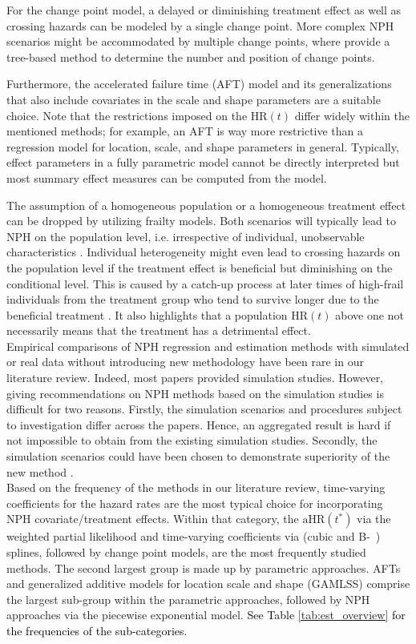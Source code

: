 \documentclass{article}
\newcommand{\NEW}[2][black]{\textcolor{#1}{#2}}
\begin{document}
\noindent For the change point model, a delayed or diminishing treatment effect as well as crossing hazards can be modeled by a single change point. 
More complex NPH scenarios might be accommodated by multiple change points, where \cite{Xu.2002} provide a tree-based method to determine the number and position of change points.

\noindent Furthermore, the accelerated failure time (AFT) model and its generalizations that also include covariates in the scale and shape parameters are a suitable choice. 
Note that the restrictions imposed on the $\text{HR}(t)$ differ widely within the mentioned methods; for example, an AFT is way more restrictive than a regression model for location, scale, and shape parameters in general. 
Typically, effect parameters in a fully parametric model cannot be directly interpreted but most summary effect measures can be computed from the model.

\noindent The assumption of a homogeneous population or a homogeneous treatment effect can be dropped by utilizing frailty models.
Both scenarios will typically lead to NPH on the population level, i.e. irrespective of individual, unobservable characteristics \cite{Hernan.2010,Martinussen.2020}.
Individual heterogeneity might even lead to crossing hazards on the population level if the treatment effect is beneficial but diminishing on the conditional level.
This is caused by a catch-up process at later times of high-frail individuals from the treatment group who tend to survive longer due to the beneficial treatment \cite[p.252]{Aalen.2008}.
It also highlights that a population $\text{HR}(t)$ above one not necessarily means that the treatment has a detrimental effect.
\\
\noindent Empirical comparisons of NPH regression and estimation methods with simulated or real data without introducing new methodology have been rare in our literature review.
Indeed, most papers provided simulation studies. 
However, giving recommendations on NPH methods based on the simulation studies is difficult for two reasons.
Firstly, the simulation scenarios and procedures subject to investigation differ across the papers.
Hence, an aggregated result is hard if not impossible to obtain from the existing simulation studies.
Secondly, the simulation scenarios could have been chosen to demonstrate superiority of the new method \cite{Boulesteix.2020}.
\\
\noindent
Based on the frequency of the methods in our literature review,
time-varying coefficients for the hazard rates are the most typical choice for incorporating NPH covariate/treatment effects.
Within that category, the $\text{aHR}(t^*)$ via the weighted partial likelihood and time-varying coefficients via (cubic and B-~) splines, followed by change point models, are the most frequently studied methods.
The second largest group is made up by parametric approaches. AFTs and generalized additive models for location scale and shape (GAMLSS) comprise the largest sub-group within the parametric approaches, followed by NPH approaches via the piecewise exponential model.
\NEW{See Table \ref{tab:est_overview} for the frequencies of the sub-categories.}
\end{document}
